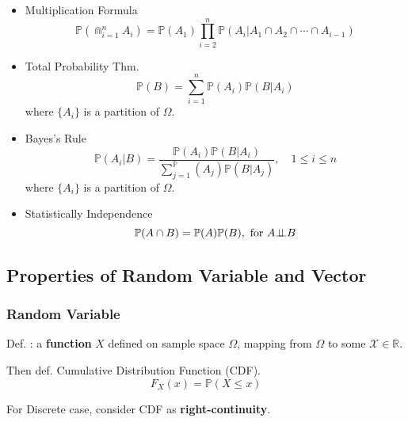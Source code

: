         \begin{itemize}
        \item Multiplication Formula
        \begin{equation}    
            \mathbb{P}(\Cap_{i=1}^n A_i)=\mathbb{P}(A_1)\prod_{i=2}^n \mathbb{P}(A_i|A_1\cap A_2\cap \cdots\cap A_{i-1})    
        \end{equation}
        \item Total Probability Thm.
        \begin{equation}    
            \mathbb{P}(B)=\sum_{i=1}^n \mathbb{P}(A_i)\mathbb{P}(B|A_i)  
        \end{equation}
        where $\{A_i\}$ is a partition of $\Omega$.
        \item Bayes's Rule
        \begin{equation}    
            \mathbb{P}(A_i|B)=\dfrac{\mathbb{P}(A_i)\mathbb{P}(B|A_i)}{\sum_{j=1}^\mathbb{P}(A_j)\mathbb{P}(B|A_j)}    ,\quad 1\leq i\leq n
        \end{equation}
        where $\{A_i\}$ is a partition of $\Omega$.
        \item Statistically Independence
        \begin{equation}    
            \mathbb{P}(A\cap B) =\mathbb{P}(A)\mathbb{P}(B),\text{ for }A\bot\!\!\!\bot B
        \end{equation}
    \end{itemize}

\subsection{Properties of Random Variable and Vector}\label{SectionPropertiesOfRandomVariableAndVector}

\subsubsection{Random Variable}
    Def. : a \textbf{function} $X$ defined on sample space $\Omega$, mapping from $\Omega$ to some $\mathscr{X}\in\mathbb{R} $.

    Then def. Cumulative Distribution Function (CDF).
    \begin{equation}
        F_X(x)=\mathbb{P} (X\leq x)
    \end{equation}

    For Discrete case, consider CDF as \textbf{right-continuity}. 

